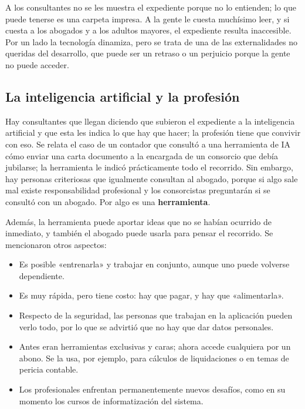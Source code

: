 \documentclass[12pt,oneside]{book}
\begin{document}
A los consultantes no se les muestra el expediente porque no lo entienden; lo que puede tenerse es una carpeta impresa. A la gente le cuesta muchísimo leer, y si cuesta a los abogados y a los adultos mayores, el expediente resulta inaccesible. Por un lado la tecnología dinamiza, pero se trata de una de las externalidades no queridas del desarrollo, que puede ser un retraso o un perjuicio porque la gente no puede acceder.

\subsection{La inteligencia artificial y la profesión}

Hay consultantes que llegan diciendo que subieron el expediente a la inteligencia artificial y que esta les indica lo que hay que hacer; la profesión tiene que convivir con eso. Se relata el caso de un contador que consultó a una herramienta de IA cómo enviar una carta documento a la encargada de un consorcio que debía jubilarse; la herramienta le indicó prácticamente todo el recorrido. Sin embargo, hay personas criteriosas que igualmente consultan al abogado, porque si algo sale mal existe responsabilidad profesional y los consorcistas preguntarán si se consultó con un abogado. Por algo es una \textbf{herramienta}.

Además, la herramienta puede aportar ideas que no se habían ocurrido de inmediato, y también el abogado puede usarla para pensar el recorrido. Se mencionaron otros aspectos:

\begin{itemize}
    \item Es posible «entrenarla» y trabajar en conjunto, aunque uno puede volverse dependiente.
    \item Es muy rápida, pero tiene costo: hay que pagar, y hay que «alimentarla».
    \item Respecto de la seguridad, las personas que trabajan en la aplicación pueden verlo todo, por lo que se advirtió que no hay que dar datos personales.
    \item Antes eran herramientas exclusivas y caras; ahora accede cualquiera por un abono. Se la usa, por ejemplo, para cálculos de liquidaciones o en temas de pericia contable.
    \item Los profesionales enfrentan permanentemente nuevos desafíos, como en su momento los cursos de informatización del sistema.
\end{itemize}
\end{document}
